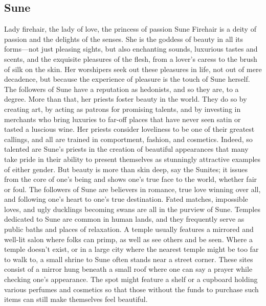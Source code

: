 \documentclass[10pt,a4paper,twoside,twocolumn,openany,bg=print,nodeprecatedcode]{dndbook}
\begin{document}
\subsection{Sune}
Lady firehair, the lady of love, the princess of passion
Sune Firehair is a deity of passion and the delights of the senses. She is the goddess of beauty in all its forms—not just pleasing sights, but also enchanting sounds, luxurious tastes and scents, and the exquisite pleasures of the flesh, from a lover's caress to the brush of silk on the skin. Her worshipers seek out these pleasures in life, not out of mere decadence, but because the experience of pleasure is the touch of Sune herself.
The followers of Sune have a reputation as hedonists, and so they are, to a degree. More than that, her priests foster beauty in the world. They do so by creating art, by acting as patrons for promising talents, and by investing in merchants who bring luxuries to far-off places that have never seen satin or tasted a luscious wine.
Her priests consider loveliness to be one of their greatest callings, and all are trained in comportment, fashion, and cosmetics. Indeed, so talented are Sune's priests in the creation of beautiful appearances that many take pride in their ability to present themselves as stunningly attractive examples of either gender.
But beauty is more than skin deep, say the Sunites; it issues from the core of one's being and shows one's true face to the world, whether fair or foul. The followers of Sune are believers in romance, true love winning over all, and following one's heart to one's true destination. Fated matches, impossible loves, and ugly ducklings becoming swans are all in the purview of Sune.
Temples dedicated to Sune are common in human lands, and they frequently serve as public baths and places of relaxation. A temple usually features a mirrored and well-lit salon where folks can primp, as well as see others and be seen. Where a temple doesn't exist, or in a large city where the nearest temple might be too far to walk to, a small shrine to Sune often stands near a street corner. These sites consist of a mirror hung beneath a small roof where one can say a prayer while checking one's appearance. The spot might feature a shelf or a cupboard holding various perfumes and cosmetics so that those without the funds to purchase such items can still make themselves feel beautiful.
\end{document}
